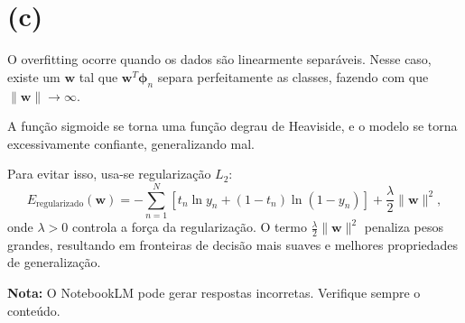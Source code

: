 \documentclass[12pt]{article}
\begin{document}
\section*{(c)}
O overfitting ocorre quando os dados são linearmente separáveis. Nesse caso, existe um $\mathbf{w}$ tal que $\mathbf{w}^T \boldsymbol{\phi}_n$ separa perfeitamente as classes, fazendo com que $\|\mathbf{w}\| \to \infty$.

A função sigmoide se torna uma função degrau de Heaviside, e o modelo se torna excessivamente confiante, generalizando mal.

Para evitar isso, usa-se regularização $L_2$:
\[
E_{\text{regularizado}}(\mathbf{w}) = -\sum_{n=1}^{N} \left[ t_n \ln y_n + (1 - t_n) \ln(1 - y_n) \right] + \frac{\lambda}{2} \|\mathbf{w}\|^2,
\]
onde $\lambda > 0$ controla a força da regularização. O termo $\frac{\lambda}{2} \|\mathbf{w}\|^2$ penaliza pesos grandes, resultando em fronteiras de decisão mais suaves e melhores propriedades de generalização.

\vspace{1em}
\noindent\textbf{Nota:} O NotebookLM pode gerar respostas incorretas. Verifique sempre o conteúdo.
\end{document}
